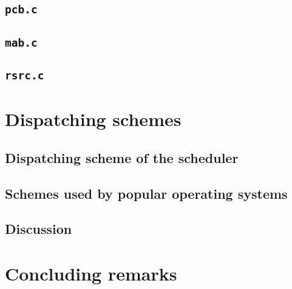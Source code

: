 \documentclass[12pt]{article}
\begin{document}
\subsection{\tt{pcb.c}}

\subsection{\tt{mab.c}}

\subsection{\tt{rsrc.c}}

\section{Dispatching schemes}

\subsection{Dispatching scheme of the scheduler}

\subsection{Schemes used by popular operating systems}

\subsection{Discussion}

\section{Concluding remarks}



\end{document}
